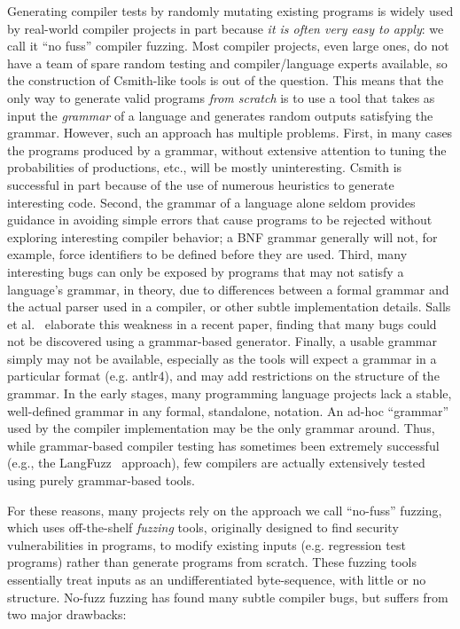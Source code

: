 \begin{sloppypar}
Generating compiler tests by randomly mutating existing programs is widely used by
real-world compiler projects in part because \emph{it is often very easy to
  apply}: we call it ``no fuss'' compiler fuzzing.  Most compiler projects, even large ones, do not have a team
of spare random testing and compiler/language experts available, so the construction of
Csmith-like tools is out of the question.  This means that the only
way to generate valid programs \emph{from scratch} is to use a tool that takes as
input the \emph{grammar} of a language and generates random outputs
satisfying the grammar.   However, such an approach has multiple problems.
First, in many cases the programs produced by a grammar, without
extensive attention to tuning the probabilities of productions, etc., will be mostly uninteresting.
Csmith is successful in part because of the use of numerous heuristics
to generate interesting code.  Second, the grammar of a language alone
seldom provides guidance in avoiding simple errors that cause programs
to be rejected without exploring interesting compiler behavior; a BNF
grammar generally will not, for example, force identifiers to be
defined before they are used.  Third, many interesting bugs can only
be exposed by programs that may not satisfy a language's grammar, in
theory, due to differences between a formal grammar and the actual
parser used in a compiler, or other subtle implementation details.
Salls et al.~\cite{Salls2021TokenLevel} elaborate this weakness in a
recent paper, finding that many bugs could not be discovered using a
grammar-based generator.
Finally, a usable grammar simply may not be available, especially as the
tools will expect a grammar in a particular format (e.g. antlr4), and may add
restrictions on the structure of the grammar.  In the early stages,
many programming language projects lack a stable, well-defined
grammar in any formal, standalone, notation.  An ad-hoc ``grammar'' used by the compiler implementation may be the
only grammar around.  Thus, while grammar-based compiler
testing has sometimes been extremely successful (e.g., the
LangFuzz~\cite{LangFuzz} approach), few compilers are actually
extensively tested using purely grammar-based tools.
\end{sloppypar}

For these reasons, many projects rely on the approach we call ``no-fuss''
fuzzing, which uses off-the-shelf \emph{fuzzing} tools,
originally designed to find security vulnerabilities in programs, to
modify existing inputs (e.g. regression test programs) rather than generate programs from
scratch.  These fuzzing tools essentially treat inputs as an
undifferentiated byte-sequence, with little or no structure.  No-fuzz
fuzzing has found many subtle compiler bugs, but
suffers from two major drawbacks:

